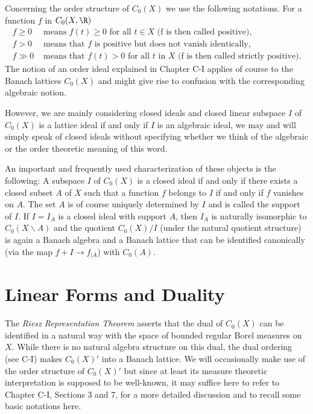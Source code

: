 Concerning the order structure of $C_{0}(X)$ we use the following notations.
For a function $f$ in $C_{0}(X,\R)$
\[
\begin{aligned}
	f \geq 0 &\text{ means } f(t) \geq 0 \text{ for all } t \in X \text{ (f is 			             then called positive)}, \\
	f > 0 &\text{ means that } f \text{ is positive but does not vanish identically}, \\
	f \gg 0 &\text{ means that } f(t) > 0 \text{ for all } t \text{ in } X \text{ (f is then called strictly positive)}.
\end{aligned}
\]
The notion of an order ideal explained in Chapter C-I applies of course to the Banach lattices $C_{0}(X)$ and might give rise to confusion with the corresponding algebraic notion.

However, we are mainly considering closed ideals and closed linear subspace $I$ of $C_{0}(X)$ is a lattice ideal if and only if $I$ is an algebraic ideal, we may and will simply speak of closed ideals without specifying whether we think of the algebraic or the order theoretic meaning of this word.

An important and frequently used characterization of these objects is the following: A subspace $I$ of $C_{0}(X)$ is a closed ideal if and only if there exists a closed subset $A$ of $X$ such that a function $f$ belongs to $I$ if and only if $f$ vanishes on $A$.
The set $A$ is of course uniquely determined by $I$ and is called the support of $I$.
If $I = I_{A}$ is a closed ideal with support $A$, then $I_{A}$ is naturally isomorphic to $C_{0}(X\backslash A)$ and the quotient $C_{0}(X)/I$ (under the natural quotient structure) is again a Banach algebra and a Banach lattice that can be identified canonically (via the map $f + I \to f_{|A}$) with $C_{0}(A)$.
\section{Linear Forms and Duality}\label{sec:b1-2}
The \emph{Riesz Representation Theorem} asserts that the dual of $C_{0}(X)$ can be identified in a natural way with the space of bounded regular Borel measures on $X$.
While there is no natural algebra structure on this dual, the dual ordering (see C-I) makes $C_{0}(X)'$ into a Banach lattice.
We will occasionally make use of the order structure of $C_{0}(X)'$ but since at least its measure theoretic interpretation is supposed to be well-known, it may suffice here to refer to Chapter C-I, Sections 3 and 7, for a more detailed discussion and to recall some basic notations here.

